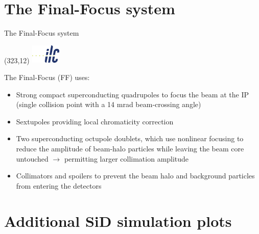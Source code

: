 \documentclass[xcolor={dvipsnames}]{beamer}
\newcommand{\ilclogo}{
  \setlength{\TPHorizModule}{1pt}
  \setlength{\TPVertModule}{1pt}
  \begin{textblock}{1}(323,12)
   \includegraphics[width=40pt,height=26pt]{figures/ILC.jpeg}
  \end{textblock}
}
\begin{document}
\section{The Final-Focus system}
\begin{frame}{The Final-Focus system}
 \ilclogo
 The Final-Focus (FF) uses:
\begin{itemize}
 \item Strong compact superconducting quadrupoles to focus the
beam at the IP (single collision point with a 14 mrad beam-crossing angle)
\item Sextupoles providing local chromaticity correction
\item Two superconducting octupole doublets, which use nonlinear
focusing to reduce the amplitude of beam-halo particles while leaving the beam core untouched $\rightarrow$ permitting larger collimation amplitude
\item Collimators and spoilers to prevent the beam halo and background particles from entering the detectors
\end{itemize}

\end{frame}


\section{Additional SiD simulation plots}
\end{document}
